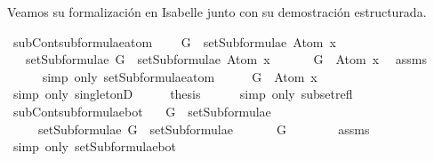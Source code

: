 \begin{isabellebody}
\begin{isamarkuptext}
Veamos su formalización en Isabelle junto con su demostración 
  estructurada.%
\end{isamarkuptext}\isamarkuptrue%
\isamarkupfalse%
\ subContsubformulae{\isacharunderscore}atom{\isacharcolon}\ \isanewline
\ \ \ {\isachardoublequoteopen}G\ {\isasymin}\ setSubformulae\ {\isacharparenleft}Atom\ x{\isacharparenright}{\isachardoublequoteclose}\ \isanewline
\ \ \ {\isachardoublequoteopen}setSubformulae\ G\ {\isasymsubseteq}\ setSubformulae\ {\isacharparenleft}Atom\ x{\isacharparenright}{\isachardoublequoteclose}\isanewline
%
\isadelimproof
%
\endisadelimproof
%
\isatagproof
{}\isamarkupfalse%
\ {\isacharminus}\ \isanewline
\ \ \isamarkupfalse%
\ {\isachardoublequoteopen}G\ {\isasymin}\ {\isacharbraceleft}Atom\ x{\isacharbraceright}{\isachardoublequoteclose}\ \isamarkupfalse%
\ assms\ \isanewline
\ \ \ \ \isamarkupfalse%
\ {\isacharparenleft}simp\ only{\isacharcolon}\ setSubformulae{\isacharunderscore}atom{\isacharparenright}\isanewline
\ \ \isamarkupfalse%
\ \isamarkupfalse%
\ {\isachardoublequoteopen}G\ {\isacharequal}\ Atom\ x{\isachardoublequoteclose}\isanewline
\ \ \ \ \isamarkupfalse%
\ {\isacharparenleft}simp\ only{\isacharcolon}\ singletonD{\isacharparenright}\isanewline
\ \ \isamarkupfalse%
\ \isamarkupfalse%
\ {\isacharquery}thesis\isanewline
\ \ \ \ \isamarkupfalse%
\ {\isacharparenleft}simp\ only{\isacharcolon}\ subset{\isacharunderscore}refl{\isacharparenright}\isanewline
{}\isamarkupfalse%
%
\endisatagproof
{\isafoldproof}%
%
\isadelimproof
\isanewline
%
\endisadelimproof
\isanewline
{}\isamarkupfalse%
\ subContsubformulae{\isacharunderscore}bot{\isacharcolon}\isanewline
\ \ \ {\isachardoublequoteopen}G\ {\isasymin}\ setSubformulae\ {\isasymbottom}{\isachardoublequoteclose}\ \isanewline
\ \ \ \ \ {\isachardoublequoteopen}setSubformulae\ G\ {\isasymsubseteq}\ setSubformulae\ {\isasymbottom}{\isachardoublequoteclose}\isanewline
%
\isadelimproof
%
\endisadelimproof
%
\isatagproof
{}\isamarkupfalse%
\ {\isacharminus}\isanewline
\ \ \isamarkupfalse%
\ {\isachardoublequoteopen}G\ {\isasymin}\ {\isacharbraceleft}{\isasymbottom}{\isacharbraceright}{\isachardoublequoteclose}\isanewline
\ \ \ \ \isamarkupfalse%
\ assms\isanewline
\ \ \ \ \isamarkupfalse%
\ {\isacharparenleft}simp\ only{\isacharcolon}\ setSubformulae{\isacharunderscore}bot{\isacharparenright}\isanewline

\end{isabellebody}
